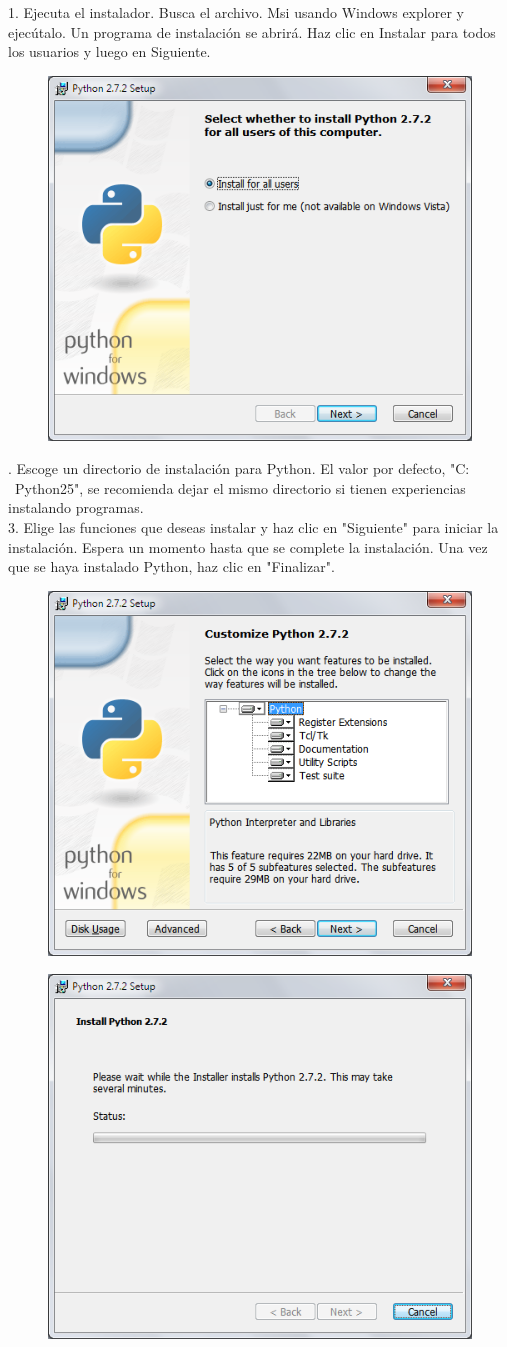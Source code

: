 \documentclass[11pt]{article} %
\begin{document}
1.	Ejecuta el instalador. Busca el archivo. Msi usando Windows explorer y ejecútalo. Un programa de instalación se abrirá. Haz clic en Instalar para todos los usuarios y luego en Siguiente.\\
\begin{figure}[htbp]
\begin{center}
\includegraphics[width=.30\textwidth]{./imagenes/primerpaso.png}
\label{qt}
\end{center}
\end{figure}
.	Escoge un directorio de instalación para Python. El valor por defecto, "C: \ Python25", se recomienda dejar el mismo directorio si tienen experiencias instalando programas.\\

3.	Elige las funciones que deseas instalar y haz clic en "Siguiente" para iniciar la instalación. Espera un momento hasta que se complete la instalación. Una vez que se haya instalado Python, haz clic en "Finalizar".\\
\begin{figure}[htbp]
\begin{center}
\includegraphics[width=.30\textwidth]{./imagenes/segundopaso.png}

\label{qt}
\end{center}
\end{figure}

\begin{figure}[htbp]
\begin{center}
\includegraphics[width=.30\textwidth]{./imagenes/tercerpaso.png}
\label{qt}
\end{center}
\end{figure}
\end{document}
